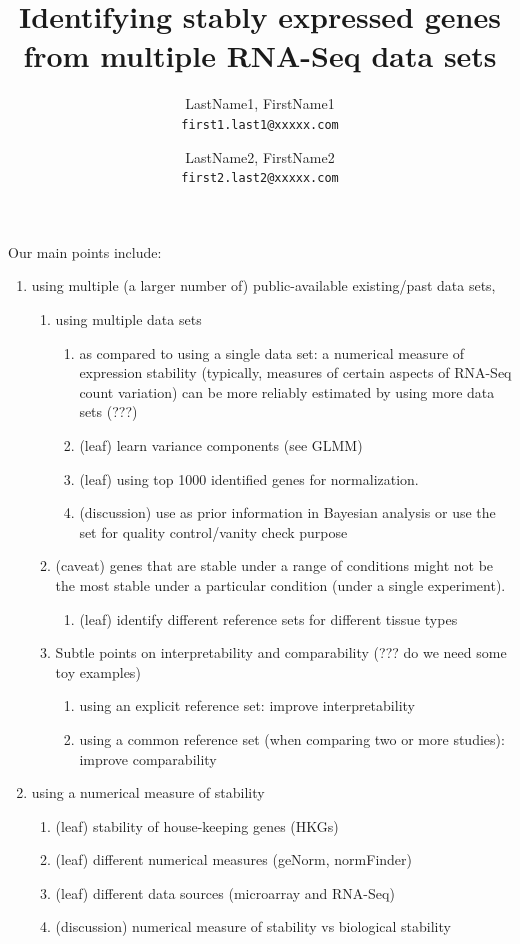 \documentclass[letterpaper,12pt]{article}
\title{Identifying stably expressed genes from multiple RNA-Seq data sets}
\date{} %
\begin{document}
	
	
	\author{
		LastName1, FirstName1\\
		\texttt{first1.last1@xxxxx.com}
		\and
		LastName2, FirstName2\\
		\texttt{first2.last2@xxxxx.com}
	}

Our main points include: 
\begin{enumerate}
    \item using multiple (a larger number of) public-available existing/past data sets, 
	\begin{enumerate}
	    \item
		using multiple data sets 
		\begin{enumerate}
		    \item
			as compared to using a single data set: a numerical
			measure of expression stability (typically, measures
			of certain aspects of RNA-Seq count variation) can be
			more reliably estimated by using more data sets (???)
		    \item
			(leaf) learn variance components (see GLMM)
		    \item
			(leaf) using top 1000 identified genes for
			normalization.
		    \item
			(discussion) use as prior information in Bayesian analysis or
			use the  set for quality control/vanity check purpose
		\end{enumerate}
	    \item
		(caveat) genes that are stable under a range of conditions
		might not be the most stable under a particular condition
		(under a single experiment).
		\begin{enumerate}
		    \item
			(leaf) identify different reference sets for different tissue
			types
		\end{enumerate}

	    \item Subtle points on interpretability and comparability (??? do
		we need some toy examples)

		\begin{enumerate}
		    \item
			using an explicit reference set: improve interpretability
		    \item
			using a common reference set (when comparing two or more studies): improve comparability
		\end{enumerate}
	\end{enumerate}

    \item
	using a numerical measure of stability
	\begin{enumerate}
	    \item
		(leaf) stability of house-keeping genes (HKGs)
	    \item
		(leaf) different numerical measures (geNorm, normFinder)
	    \item
		(leaf) different data sources (microarray and RNA-Seq)
	    \item
		(discussion) numerical measure of stability vs biological
		stability 
	\end{enumerate}



\end{enumerate}
\end{document}
